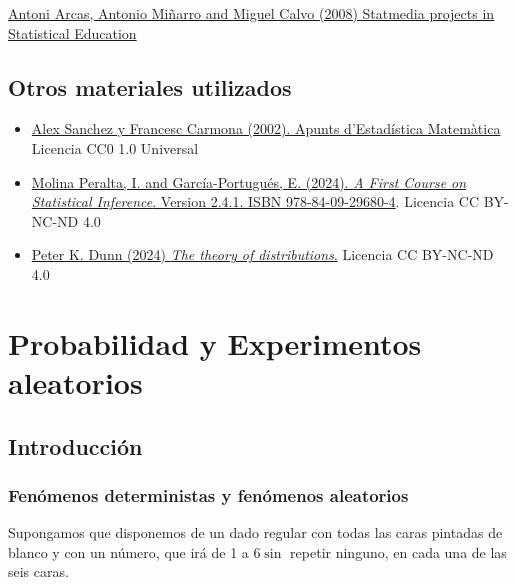 \documentclass[
  a4paper,
  DIV=11,
  numbers=noendperiod]{scrreprt}
\begin{document}
\href{https://www.emis.de/journals/BEIO/files/BEIOv25n1_HE_A.Arcas+A.Minarro+M.Calvo.pdf}{Antoni
Arcas, Antonio Miñarro and Miguel Calvo (2008) Statmedia projects in
Statistical Education}

\section*{Otros materiales
utilizados}\label{otros-materiales-utilizados}


\begin{itemize}
\item
  \href{https://github.com/ASPteaching/ApuntsEstadisticaMatematica}{Alex
  Sanchez y Francesc Carmona (2002). Apunts d'Estadística Matemàtica}
  Licencia CC0 1.0 Universal
\item
  \href{https://bookdown.org/egarpor/inference/}{Molina Peralta, I. and
  García-Portugués, E. (2024). \emph{A First Course on Statistical
  Inference}. Version 2.4.1. ISBN 978-84-09-29680-4}. Licencia CC
  BY-NC-ND 4.0
\item
  \href{https://bookdown.org/pkaldunn/DistTheory}{Peter K. Dunn (2024)
  \emph{The theory of distributions}.} Licencia CC BY-NC-ND 4.0
\end{itemize}


\chapter{Probabilidad y Experimentos
aleatorios}\label{probabilidad-y-experimentos-aleatorios}

\section{Introducción}\label{introducciuxf3n}

\subsection{Fenómenos deterministas y fenómenos
aleatorios}\label{fenuxf3menos-deterministas-y-fenuxf3menos-aleatorios}

Supongamos que disponemos de un dado regular con todas las caras
pintadas de blanco y con un número, que irá de 1 a \(6 \sin\) repetir
ninguno, en cada una de las seis caras.
\end{document}
